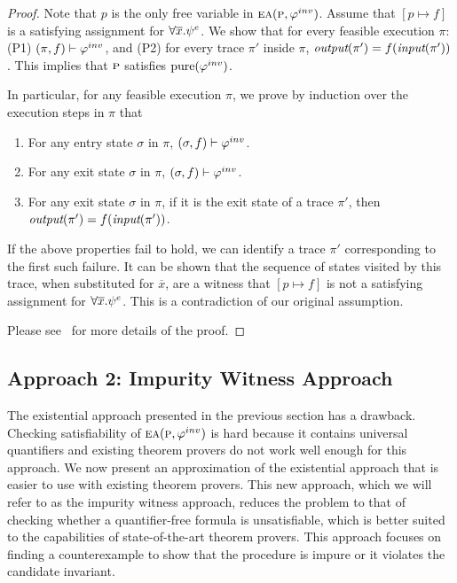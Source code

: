 \begin{proof}

Note that $p$ is the only free variable in $\textsc{ea}(\textsc{p},\varphi^{inv})$. Assume that $[p \mapsto f]$ is a
satisfying assignment
for  $ \forall \overline{x}. \psi^e$.
We show that for every feasible execution $\pi$: (P1) $(\pi, f)
\vdash \varphi^{inv}$, and (P2) for every trace $\pi'$ inside $\pi$,
$\textit{output}(\pi') = f(\textit{input}(\pi'))$. This implies that
$\textsc{p}$ satisfies $\mathrm{pure}(\varphi^{inv})$.

In particular, for any feasible execution $\pi$, we prove by induction over the
execution steps in $\pi$ that
\begin{enumerate}
\item For any entry state $\sigma$ in $\pi$, $(\sigma,f) \vdash \varphi^{inv}$.
\item For any exit state $\sigma$ in $\pi$, $(\sigma,f) \vdash \varphi^{inv}$.
\item For any exit state $\sigma$ in $\pi$, if it is the exit state of a trace $\pi'$,
then $\textit{output}(\pi') = f(\textit{input}(\pi'))$.
\end{enumerate}

If the above properties fail to hold, we can identify a trace $\pi'$ corresponding
to the first such failure. It can be shown that the sequence of
states visited by this trace, when substituted for $\overline{x}$, are a
witness that $[p \mapsto f]$ is not a satisfying assignment for  $\forall
\overline{x}. \psi^e$. This is a contradiction of our original
assumption. 


Please see~\cite{CheckingOP:arxiv} for more details of the proof.

\end{proof}

\subsection{Approach 2: Impurity Witness Approach}

The existential approach presented in the previous section has a drawback. Checking satisfiability of $\textsc{ea}(\textsc{p},\varphi^{inv})$
is hard because it contains universal quantifiers and existing theorem provers do not work well enough for this
approach. We now present an approximation of the existential approach that is easier to use with existing theorem
provers. This new approach, which we will refer to as the impurity witness approach, reduces the problem to
that of checking whether a quantifier-free formula is unsatisfiable, which is better suited to the capabilities of
state-of-the-art theorem provers. This approach focuses on finding a counterexample to show that the
procedure is impure or it violates the candidate invariant.

